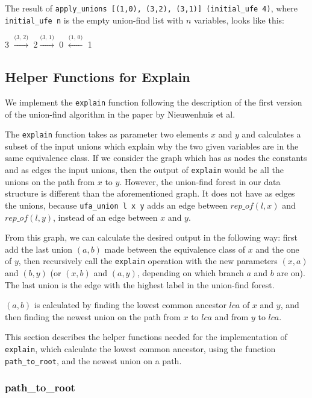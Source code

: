\begin{exmp}\label{example:apply-unions}
The result of \lstinline|apply_unions [(1,0), (3,2), (3,1)] (initial_ufe 4)|, where \lstinline|initial_ufe n| is the empty union-find list with $n$ variables, looks like this:

3 $\xrightarrow{\text{(3, 2)}}$ 2$\xrightarrow{\text{(3, 1)}}$ 0 $\xleftarrow{\text{(1, 0)}}$ 1 \
\end{exmp}

\subsection{Helper Functions for Explain}

We implement the \lstinline|explain| function following the description of the first version of the union-find algorithm in the paper by Nieuwenhuis et al. \cite{Nieuwenhuis}

The \lstinline|explain| function takes as parameter two elements $x$ and $y$ and calculates a subset of the input unions which explain why the two given variables are in the same equivalence class. If we consider the graph which has as nodes the constants and as edges the input unions, then the output of \lstinline|explain| would be all the unions on the path from $x$ to $y$. However, the union-find forest in our data structure is different than the aforementioned graph. It does not have as edges the unions, because \lstinline|ufa_union l x y| adds an edge between $rep\_of(l, x)$ and $rep\_of(l, y)$, instead of an edge between $x$ and $y$.

From this graph, we can calculate the desired output in the following way: first add the last union $(a, b)$ made between the equivalence class of $x$ and the one of $y$, then recursively call the \lstinline|explain| operation with the new parameters $(x, a)$ and $(b, y)$ (or $(x, b)$ and $(a, y)$, depending on which branch $a$ and $b$ are on). The last union is the edge with the highest label in the union-find forest.

$(a, b)$ is calculated by finding the lowest common ancestor $lca$ of $x$ and $y$, and then finding the newest union on the path from $x$ to $lca$ and from $y$ to $lca$.

This section describes the helper functions needed for the implementation of \lstinline|explain|, which calculate the lowest common ancestor, using the function \lstinline{path_to_root}, and the newest union on a path.

\subsubsection{path\_to\_root}
\label{subsubsection:path-to-root}

